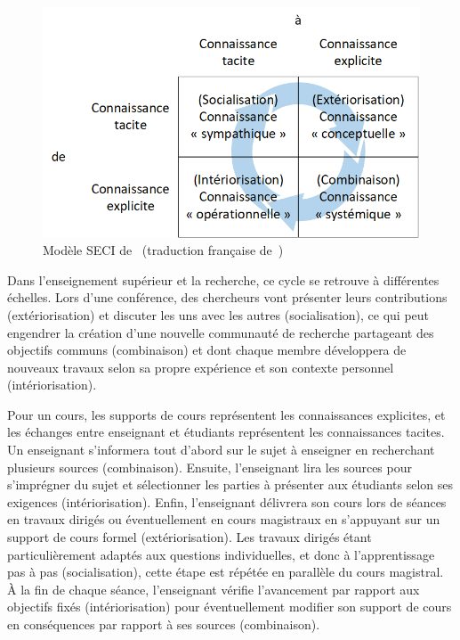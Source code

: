 \begin{figure}[ht]
\centering
\centerline{  %
\includegraphics[scale=1]{2-Etat-de-l'Art/images/KM/ModeleSECI.png}
}
\caption{Modèle SECI de~\cite{nonaka2007knowledge} (traduction française de~\cite{tebourbi2000apprentissage})}
\label{figure:2-S1-ModeleSECI}
\end{figure}

\bigskip

Dans l'enseignement supérieur et la recherche, ce cycle se retrouve à différentes échelles.
Lors d'une conférence, des chercheurs vont présenter leurs contributions (extériorisation) et discuter les uns avec les autres (socialisation), ce qui peut engendrer la création d'une nouvelle communauté de recherche partageant des objectifs communs (combinaison) et dont chaque membre développera de nouveaux travaux selon sa propre expérience et son contexte personnel (intériorisation).

Pour un cours, les supports de cours représentent les connaissances explicites, et les échanges entre enseignant et étudiants représentent les connaissances tacites.
Un enseignant s'informera tout d'abord sur le sujet à enseigner en recherchant plusieurs sources (combinaison).
Ensuite, l'enseignant lira les sources pour s'imprégner du sujet et sélectionner les parties à présenter aux étudiants selon ses exigences (intériorisation).
Enfin, l'enseignant délivrera son cours lors de séances en travaux dirigés ou éventuellement en cours magistraux en s'appuyant sur un support de cours formel (extériorisation).
Les travaux dirigés étant particulièrement adaptés aux questions individuelles, et donc à l'apprentissage pas à pas (socialisation), cette étape est répétée en parallèle du cours magistral.
À la fin de chaque séance, l'enseignant vérifie l'avancement par rapport aux objectifs fixés (intériorisation) pour éventuellement modifier son support de cours en conséquences par rapport à ses sources (combinaison).

